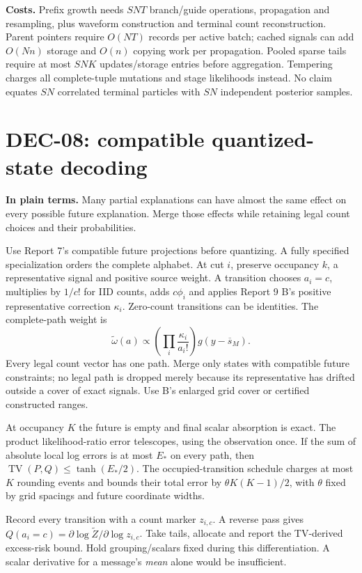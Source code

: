 \documentclass[10pt,a4paper]{article}
\newcommand{\TV}{\operatorname{TV}}
\begin{document}
\textbf{Costs.} Prefix growth needs $SNT$ branch/guide operations, propagation and resampling,
plus waveform construction and terminal count reconstruction. Parent pointers require $O(NT)$ records
per active batch; cached signals can add $O(Nn)$ storage and $O(n)$ copying work per propagation.
Pooled sparse tails require at most $SNK$ updates/storage entries before aggregation.
Tempering charges all complete-tuple mutations and stage likelihoods instead.
No claim equates $SN$ correlated terminal particles with $SN$ independent posterior samples.

\clearpage
\section{DEC-08: compatible quantized-state decoding}
\label{sec:states}
\textbf{In plain terms.} Many partial explanations can have almost the same effect on every possible
future explanation. Merge those effects while retaining legal count choices and their probabilities.

Use Report 7's compatible future projections before quantizing. A fully specified specialization orders
the complete alphabet. At cut $i$, preserve occupancy $k$, a representative signal and positive source
weight. A transition chooses $a_i=c$, multiplies by $1/c!$ for IID counts, adds $c\phi_i$ and applies
Report 9 B's positive representative correction $\kappa_i$. Zero-count transitions can be identities.
The complete-path weight is
\[
 \widetilde\omega(a)\propto
       \left(\prod_i\frac{\kappa_i}{a_i!}\right)g(y-\overline s_M).
\]
Every legal count vector has one path. Merge only states with compatible future constraints; no legal
path is dropped merely because its representative has drifted outside a cover of exact signals.
Use B's enlarged grid cover or certified constructed ranges.

At occupancy $K$ the future is empty and final scalar absorption is exact.
The product likelihood-ratio error telescopes, using the observation once.
If the sum of absolute local log errors is at most $E_*$ on every path, then
$\TV(P,Q)\leq\tanh(E_*/2)$.
The occupied-transition schedule charges at most $K$ rounding events and bounds their total error by
$\theta K(K-1)/2$, with $\theta$ fixed by grid spacings and future coordinate widths.

Record every transition with a count marker $z_{i,c}$. A reverse pass gives
$Q(a_i=c)=\partial\log\widetilde Z/\partial\log z_{i,c}$.
Take tails, allocate and report the TV-derived excess-risk bound. Hold grouping/scalars fixed during
this differentiation. A scalar derivative for a message's \emph{mean} alone would be insufficient.
\end{document}
